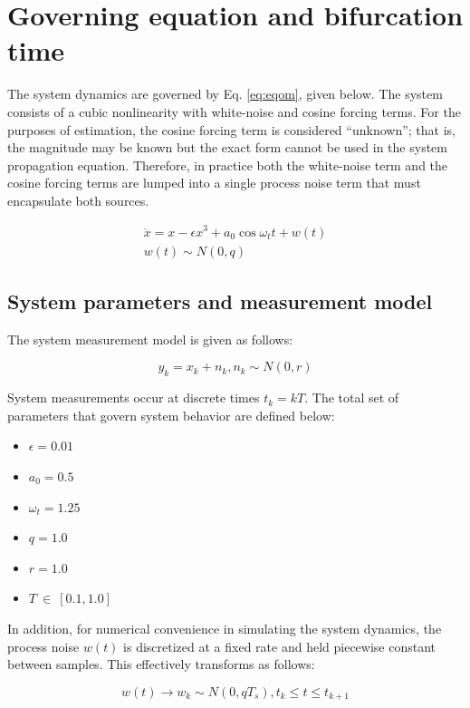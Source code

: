 \documentclass[]{article}
\begin{document}
\section{Governing equation and bifurcation time}

The system dynamics are governed by Eq. \ref{eq:eqom}, given below. The system consists of a cubic nonlinearity with white-noise and cosine forcing terms. For the purposes of estimation, the cosine forcing term is considered ``unknown''; that is, the magnitude may be known but the exact form cannot be used in the system propagation equation. Therefore, in practice both the white-noise term and the cosine forcing terms are lumped into a single process noise term that must encapsulate both sources.

\begin{align}
\ddot{x} = x - \epsilon x^3 + a_0 \cos{\omega_t t} + w(t) \label{eq:eqom} \\
w(t) \sim N(0,q)
\end{align}

\subsection{System parameters and measurement model}

The system measurement model is given as follows:

\begin{equation}
y_k = x_k + n_k, n_k \sim N(0,r)
\end{equation}

System measurements occur at discrete times $t_k = kT$. The total set of parameters that govern system behavior are defined below:

\begin{itemize}
\item $\epsilon = 0.01$
\item $a_0 = 0.5$
\item $\omega_t = 1.25$
\item $q = 1.0$
\item $r = 1.0$
\item $T \ \in \ [0.1,1.0]$
\end{itemize}

In addition, for numerical convenience in simulating the system dynamics, the process noise $w(t)$ is discretized at a fixed rate and held piecewise constant between samples. This effectively transforms as follows:

\begin{equation}
w(t) \rightarrow w_k \sim N(0,qT_s), t_k \leq t \leq t_{k+1}
\end{equation}
\end{document}
